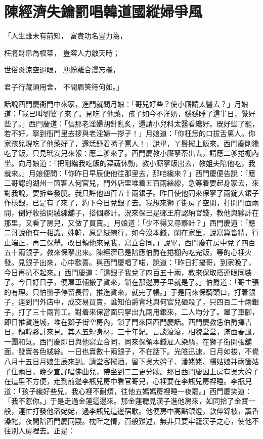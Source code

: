 %

\chapter{陳經濟失鑰罰唱\KG 韓道國縱婦爭風}


\begin{showcontents}{}



「人生雖未有前知，  富貴功名豈力為，

枉將財帛為根蒂，  豈容人力敵天時；

世俗炎涼空過眼，  塵紛離合漫忘機，

君子行藏須用舍，  不開眉笑待何如。」

話說西門慶衙門中來家，進門就問月娘：「哥兒好些？使小廝請太醫去？」月娘道：「我已叫劉婆子來了。見吃了他藥，孩子如今不洋奶，穩穩睡了這半日，覺好些了。」西門慶道：「信那老淫婦胡針亂炙，還請小兒科太醫看纔好。既好些了罷，若不好，拏到衙門里去拶與老淫婦一拶子！」月娘道：「你枉恁的口拔舌罵人。你家孩兒現吃了他藥好了，還恁舒着嘴子罵人！」說畢，丫鬟擺上飯來。西門慶剛纔吃了飯，只見玳安兒來報：應二爹來了。西門慶教小廝拏茶出去，請應二爹捲棚內坐。向月娘道：「把剛纔我吃飯的菜蔬休動，教小廝拏飯出去，教姐夫陪他吃，我就來。」月娘便問：「你昨日早辰使他往那里去，那咱纔來？」西門慶便告說：「應二哥認的湖州一箇客人何官兒，門外店里堆着五百兩絲線，急等着要起身家去，來對我說，要拆些發脫。我只許他四百五十兩銀子。昨日使他同來保拏了兩錠大銀子作樣銀，已是有了來了，約下今日兌銀子去。我想來獅子街房子空閑，打開門面兩開，倒好收拾開絨線舖子，搭個夥計。況來保已是鄆王府認納官錢，教他與夥計在那里，又看了房兒，又做了買賣。」月娘道：「少不得又尋夥計？」西門慶道：「應二哥說他有一相識，姓韓，原是絨線行，如今沒本錢，閑在家里，說寫算皆精，行止端正，再三保舉。改日領他來見我，寫立合同。」說畢，西門慶在房中兌了四百五十兩銀子，教來保拏出來。陳經濟已是陪應伯爵在捲棚內吃完飯，等的心裡火發。見銀子出來，心中歡喜。與西門慶唱了喏，說道：「昨日打擾哥，到家晚了，今日再扒不起來。」西門慶道：「這銀子我兌了四百五十兩，教來保取搭連眼同裝了。今日好日子，便雇車輛搬了貨來，鎖在那邊房子里就是了。」伯爵道：「哥主張的有理。只怕蠻子停留長智，推進貨來，就完了帳。」于是同來保騎頭口，打着銀子，逕到門外店中，成交易買賣，誰知伯爵背地與何官兒砸殺了，只四百二十兩銀子，打了三十兩背工。對着來保當面只拏出九兩用銀來，二人均分了。雇了車腳，即日推貨進城，堆在獅子街空房內，鎖了門來回西門慶話。西門慶教恁伯爵擇吉日，領韓夥計來見。其人五短身材，三十年紀。言談滾滾，相貌堂堂，滿面春風，一團和氣。西門慶即日與他寫立合同，同來保領本錢雇人染絲，在獅子街開張舖面，發賣各色絨絲。一日也賣數十兩銀子，不在話下。光陰迅速，日月如梭，不覺八月十五日月娘生辰來到。請堂客擺酒，留下吳大妗子、潘姥姥、楊姑娘并兩箇姑子住兩日，晚夕宣誦唱佛曲兒，帶坐到二三更分歇。那日西門慶因上房有吳大妗子在這里不方便，走到前邊李瓶兒房中看官哥兒，心裡要在李瓶兒房裡睡。李瓶兒道：「孩子纔好些兒，我心裡不耐煩，往他五媽媽房裡睡一夜罷。」西門慶笑道：「我不惹你。」于是走過金蓮這邊來。那金蓮聽見漢子進他房來，如同拾了金寶一般，連忙打發他潘姥姥，過李瓶兒這邊宿歇。他便房中高點銀燈，款伸錦被，薰香澡牝，夜間陪西門慶同寢。枕畔之情，百般難述，無非只要牢籠漢子之心，使他不往別人房裡去。正是：


\end{showcontents}
